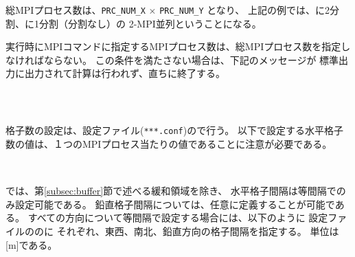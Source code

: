 総MPIプロセス数は、\verb|PRC_NUM_X| $\times$ \verb|PRC_NUM_Y|  となり、
上記の例では、\XDIR に2分割、\YDIR に1分割（分割なし）の 2-MPI並列ということになる。

実行時にMPIコマンドに指定するMPIプロセス数は、総MPIプロセス数を指定しなければならない。
この条件を満たさない場合は、下記のメッセージが
標準出力に出力されて計算は行われず、直ちに終了する。

\\

\subsection{\SubsecGridNumSettng} \label{subsec:relation_dom_reso3}

格子数の設定は、設定ファイル(\verb|***.conf|)ので行う。
以下で設定する水平格子数の値は、１つのMPIプロセス当たりの値であることに注意が必要である。\\

\\

\subsection{\SubsecGridIntvSettng} \label{subsec:gridinterv}

\scalerm では、第\ref{subsec:buffer}節で述べる緩和領域を除き、
水平格子間隔は等間隔でのみ設定可能である。
鉛直格子間隔については、任意に定義することが可能である。
すべての方向について等間隔で設定する場合には、以下のように
設定ファイルののに
それぞれ、東西、南北、鉛直方向の格子間隔を指定する。
単位は[m]である。\\

